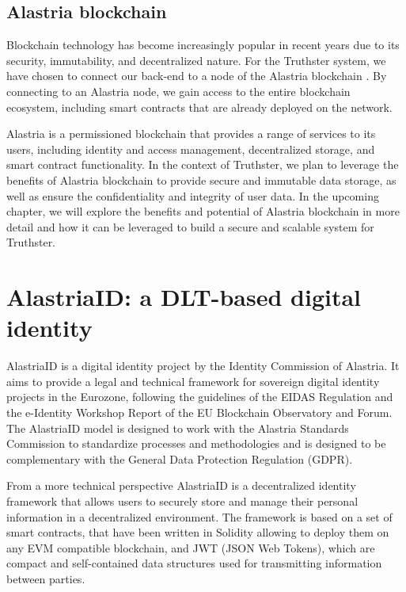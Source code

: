 \documentclass[target=mst,aauheader=]{thud}
\begin{document}
\section{Alastria blockchain}

Blockchain technology has become increasingly popular in recent years due to its security, immutability, and decentralized nature. For the Truthster system, we have chosen to connect our back-end to a node of the Alastria blockchain \cite{alastriaBlockchain}. By connecting to an Alastria node, we gain access to the entire blockchain ecosystem, including smart contracts that are already deployed on the network.

Alastria is a permissioned blockchain that provides a range of services to its users, including identity and access management, decentralized storage, and smart contract functionality. In the context of Truthster, we plan to leverage the benefits of Alastria blockchain to provide secure and immutable data storage, as well as ensure the confidentiality and integrity of user data. In the upcoming  chapter, we will explore the benefits and potential of Alastria blockchain in more detail and how it can be leveraged to build a secure and scalable system for Truthster.




\chapter{AlastriaID: a DLT-based digital identity}
\label{chapter:alastriaID}


AlastriaID is a digital identity project by the Identity Commission of Alastria. It aims to provide a legal and technical framework for sovereign digital identity projects in the Eurozone, following the guidelines of the EIDAS \cite{EIDAS} Regulation and the e-Identity Workshop Report of the EU Blockchain Observatory and Forum. The AlastriaID model is designed to work with the Alastria Standards Commission to standardize processes and methodologies and is designed to be complementary with the General Data Protection Regulation (GDPR).

From a more technical perspective AlastriaID is a decentralized identity framework that allows users to securely store and manage their personal information in a decentralized environment. The framework is based on a set of smart contracts, that have been written in Solidity \cite{solidity} allowing to deploy them on any EVM compatible blockchain, and JWT (JSON Web Tokens), which are compact and self-contained data structures used for transmitting information between parties. 
\end{document}
